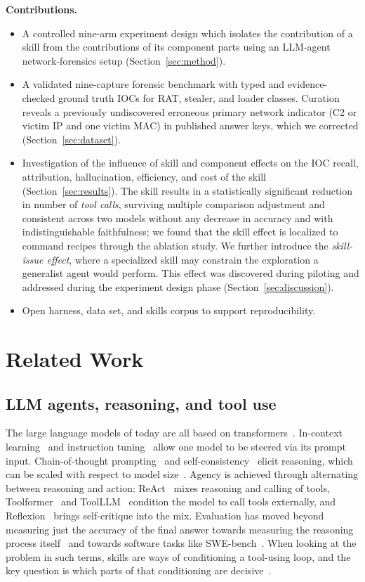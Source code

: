 \documentclass[conference]{IEEEtran}
\begin{document}
\noindent\textbf{Contributions.}
\begin{itemize}
\item A controlled nine-arm experiment design which isolates the contribution of a skill from the
contributions of its component parts using an LLM-agent network-forensics setup
(Section~\ref{sec:method}).
\item A validated nine-capture forensic benchmark with typed and evidence-checked ground truth
IOCs for RAT, stealer, and loader classes. Curation reveals a previously undiscovered
erroneous primary network indicator (C2 or victim IP and one victim MAC) in published answer
keys, which we corrected (Section~\ref{sec:dataset}).
\item Investigation of the influence of skill and component effects on the IOC recall,
attribution, hallucination, efficiency, and cost of the skill (Section~\ref{sec:results}).
The skill results in a statistically significant reduction in number of \emph{tool calls},
surviving multiple comparison adjustment and consistent across two models without any
decrease in accuracy and with indistinguishable faithfulness; we found that the skill effect
is localized to command recipes through the ablation study. We further introduce the
\emph{skill-issue effect}, where a specialized skill may constrain the exploration a
generalist agent would perform. This effect was discovered during piloting and addressed
during the experiment design phase (Section~\ref{sec:discussion}).
\item Open harness, data set, and skills corpus to support reproducibility.
\end{itemize}

\section{Related Work}

\subsection{LLM agents, reasoning, and tool use}
The large language models of today are all based on transformers~\cite{vaswani2017}.
In-context learning~\cite{brown2020} and instruction tuning~\cite{ouyang2022instructgpt}
allow one model to be steered via its prompt input. Chain-of-thought
prompting~\cite{wei2022cot} and self-consistency~\cite{wang2023selfconsistency} elicit
reasoning, which can be scaled with respect to model size~\cite{wei2022emergent}. Agency is
achieved through alternating between reasoning and action: ReAct~\cite{yao2023react} mixes
reasoning and calling of tools, Toolformer~\cite{schick2023toolformer} and
ToolLLM~\cite{qin2024toolllm} condition the model to call tools externally, and
Reflexion~\cite{shinn2023reflexion} brings self-critique into the mix. Evaluation has moved
beyond measuring just the accuracy of the final answer towards measuring the reasoning
process itself~\cite{tooltrajectories2025} and towards software tasks like
SWE-bench~\cite{jimenez2024swebench}. When looking at the problem in such terms, skills are
ways of conditioning a tool-using loop, and the key question is which parts of that
conditioning are decisive~\cite{tooluseevolution2026}.
\end{document}
